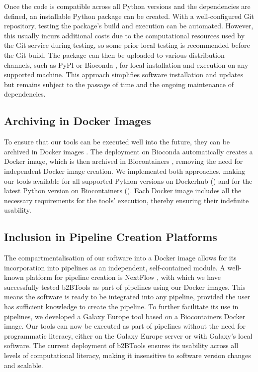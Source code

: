 Once the code is compatible across all Python versions and the dependencies are defined, an installable Python package can be created. With a well-configured Git repository, testing the package's build and execution can be automated. However, this usually incurs additional costs due to the computational resources used by the Git service during testing, so some prior local testing is recommended before the Git build. The package can then be uploaded to various distribution channels, such as PyPI \cite{pypi} or Bioconda \cite{gruning_bioconda_2018}, for local installation and execution on any supported machine. This approach simplifies software installation and updates but remains subject to the passage of time and the ongoing maintenance of dependencies.


\subsection{Archiving in Docker Images}

To ensure that our tools can be executed well into the future, they can be archived in Docker images \cite{merkel2014docker}. The deployment on Bioconda automatically creates a Docker image, which is then archived in Biocontainers \cite{da_veiga_leprevost_biocontainers_2017}, removing the need for independent Docker image creation. We implemented both approaches, making our tools available for all supported Python versions on Dockerhub () and for the latest Python version on Biocontainers (). Each Docker image includes all the necessary requirements for the tools' execution, thereby ensuring their indefinite usability.


\subsection{Inclusion in Pipeline Creation Platforms}

The compartmentalisation of our software into a Docker image allows for its incorporation into pipelines as an independent, self-contained module. A well-known platform for pipeline creation is NextFlow \cite{di_tommaso_nextflow_2017}, with which we have successfully tested b2BTools as part of pipelines using our Docker images. This means the software is ready to be integrated into any pipeline, provided the user has sufficient knowledge to create the pipeline. To further facilitate its use in pipelines, we developed a Galaxy Europe \cite{afgan_galaxy_2018} tool based on a Biocontainers Docker image. Our tools can now be executed as part of pipelines without the need for programmatic literacy, either on the Galaxy Europe server or with Galaxy's local software. The current deployment of b2BTools ensures its usability across all levels of computational literacy, making it insensitive to software version changes and scalable.


